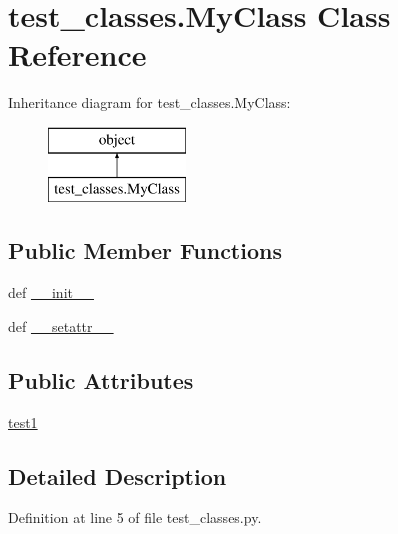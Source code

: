 \hypertarget{classtest__classes_1_1_my_class}{\section{test\-\_\-classes.\-My\-Class Class Reference}
\label{classtest__classes_1_1_my_class}
}
Inheritance diagram for test\-\_\-classes.\-My\-Class\-:\begin{figure}[H]
\begin{center}
\leavevmode
\includegraphics[height=2.000000cm]{d2/d63/classtest__classes_1_1_my_class}
\end{center}
\end{figure}
\subsection*{Public Member Functions}
\begin{DoxyCompactItemize}
\item 
def \hyperlink{classtest__classes_1_1_my_class_a7dd494c58ff3ae5f995a8ecf1face730}{\-\_\-\-\_\-init\-\_\-\-\_\-}
\item 
def \hyperlink{classtest__classes_1_1_my_class_a7886253bd105ab91453cf2a71661255b}{\-\_\-\-\_\-setattr\-\_\-\-\_\-}
\end{DoxyCompactItemize}
\subsection*{Public Attributes}
\begin{DoxyCompactItemize}
\item 
\hyperlink{classtest__classes_1_1_my_class_ad2d3f2b80c691f06bdec104b23e77cfa}{test1}
\end{DoxyCompactItemize}


\subsection{Detailed Description}


Definition at line 5 of file test\-\_\-classes.\-py.



